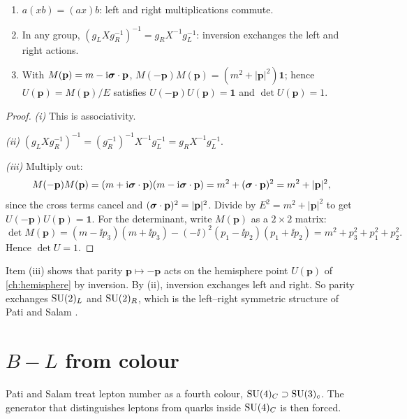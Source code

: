 \begin{proposition}\label{prop:leftright}\ver\
\begin{enumerate}[label=(\roman*)]
\item $a(xb)=(ax)b$: left and right multiplications commute.
\item In any group, $(g_LXg_R^{-1})^{-1}=g_RX^{-1}g_L^{-1}$: inversion exchanges the left and right actions.
\item With $M(\mathbf p)=m-\mathrm{i}\boldsymbol{\sigma}\cdot\mathbf p$, $M(-\mathbf p)M(\mathbf p)=(m^2+|\mathbf p|^2)\mathbf 1$; hence $U(\mathbf p)=M(\mathbf p)/E$ satisfies $U(-\mathbf p)U(\mathbf p)=\mathbf 1$ and $\det U(\mathbf p)=1$.
\end{enumerate}
\end{proposition}
\begin{proof}
\emph{(i)} This is associativity.

\emph{(ii)} $(g_LXg_R^{-1})^{-1}=(g_R^{-1})^{-1}X^{-1}g_L^{-1}=g_RX^{-1}g_L^{-1}$.

\emph{(iii)} Multiply out:
\[
M(-\mathbf p)M(\mathbf p)=(m+\mathrm{i}\boldsymbol{\sigma}\cdot\mathbf p)(m-\mathrm{i}\boldsymbol{\sigma}\cdot\mathbf p)=m^2+(\boldsymbol{\sigma}\cdot\mathbf p)^2=m^2+|\mathbf p|^2 ,
\]
since the cross terms cancel and $(\boldsymbol{\sigma}\cdot\mathbf p)^2=|\mathbf p|^2$. Divide by $E^2=m^2+|\mathbf p|^2$ to get $U(-\mathbf p)U(\mathbf p)=\mathbf 1$. For the determinant, write $M(\mathbf p)$ as a $2\times2$ matrix:
\[
\det M(\mathbf p)=(m-\ii p_3)(m+\ii p_3)-(-\ii)^2(p_1-\ii p_2)(p_1+\ii p_2)=m^2+p_3^2+p_1^2+p_2^2 .
\]
Hence $\det U=1$.
\end{proof}


Item (iii) shows that parity $\mathbf p\mapsto-\mathbf p$ acts on the hemisphere point $U(\mathbf p)$ of \cref{ch:hemisphere} by inversion. By (ii), inversion exchanges left and right. So parity exchanges $\mathrm{SU}(2)_L$ and $\mathrm{SU}(2)_R$, which is the left--right symmetric structure of Pati and Salam \cite{PatiSalam1974}.

\section{\texorpdfstring{$B-L$}{B-L} from colour}

Pati and Salam treat lepton number as a fourth colour, $\mathrm{SU}(4)_C\supset\mathrm{SU}(3)_c$. The generator that distinguishes leptons from quarks inside $\mathrm{SU}(4)_C$ is then forced.

